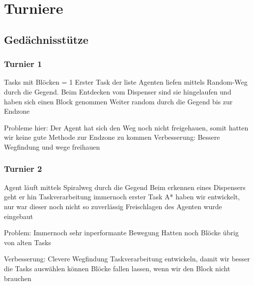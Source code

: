 \section{Turniere}

\subsection{Gedächnisstütze}
\subsubsection{Turnier 1}
Tasks mit Blöcken = 1 \newline
Erster Task der liste \newline
Agenten liefen mittels Random-Weg durch die Gegend. \newline
Beim Entdecken vom Dispenser sind sie hingelaufen und haben sich einen Block genommen \newline
Weiter random durch die Gegend bis zur Endzone \newline

Probleme hier: Der Agent hat sich den Weg noch nicht freigehauen, somit hatten wir keine gute Methode zur Endzone zu kommen \newline
Verbesserung: Bessere Wegfindung und wege freihauen

\subsubsection{Turnier 2}
Agent läuft mittels Spiralweg durch die Gegend \newline
Beim erkennen eines Dispensers geht er hin \newline
Taskverarbeitung immernoch erster Task \newline
A* haben wir entwickelt, nur war dieser noch nicht so zuverlässig \newline
Freischlagen des Agenten wurde eingebaut

Problem: Immernoch sehr inperformante Bewegung \newline
Hatten noch Blöcke übrig von alten Tasks \newline

Verbesserung: Clevere Wegfindung \newline
Taskverarbeitung entwickeln, damit wir besser die Tasks auswählen können \newline
Blöcke fallen lassen, wenn wir den Block nicht brauchen \newline

